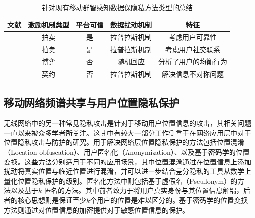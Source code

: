 \begin{table}[!htp]
	\caption{针对现有移动群智感知数据保隐私方法类型的总结}
	\centering
	\tabcolsep=10pt
	\begin{tabular}[c]{|c|c|c|c|c|}
		\hline \label{table:comparison}
		\textbf{文献} & \textbf{激励机制类型} & \textbf{平台可信} &  \textbf{数据扰动机制} & \textbf{特征} \\ \hline
		
		\cite{jin2016inception}  & 拍卖  &   是  &	拉普拉斯机制 & 考虑用户可靠性 \\ \hline

		
		\cite{zhang2016privacy}  & 拍卖  &   是  & 拉普拉斯机制  & 考虑用户社交联系 \\ \hline

		\cite{wang2016value}  & 博弈 &    否   &   随机回应 & 分析了用户的均衡行为	\\ \hline

		\cite{Kun1}  & 契约  & 否  & 拉普拉斯机制 & 解决信息不对称问题 \\ \hline

	\end{tabular}
\end{table}


\subsection{移动网络频谱共享与用户位置隐私保护}

无线网络中的另一种常见隐私攻击是针对于移动用户位置信息的攻击，其相关问题一直以来被众多学者所关注。这其中有较大一部分工作侧重于在网络应用层中对于位置隐私攻击与防护的研究。用于解决网络层位置隐私保护的方法包括位置混淆（Location obfuscation）\cite{Agrawal:Privacy}、用户匿名化（Anonymization）\cite{Beresford:Mix, Gongjournal, Shin:AnonySense}、以及基于密码学的位置变换\cite{Ghinita:Private, Khoshgozaran:Blind}。这些方法分别适用于不同的应用场景，其中位置混淆通过在位置信息上添加扰动将真实位置与临近位置进行混淆，并可以进一步结合差分隐私的工具从数学上量化位置隐私保护的级别\cite{Dwork:Differential}。匿名化方法中则包括基于虚假名（Pseudonym）的方法\cite{Beresford:Mix}以及基于$k$-匿名的方法\cite{Shin:AnonySense}。其中前者致力于将用户真实身份与其位置信息解耦，后者的核心思想则是保证至少$k$个用户的位置是难以区分的。基于密码学的位置变换方法则通过对位置信息的加密提供对于敏感位置信息的保护。

